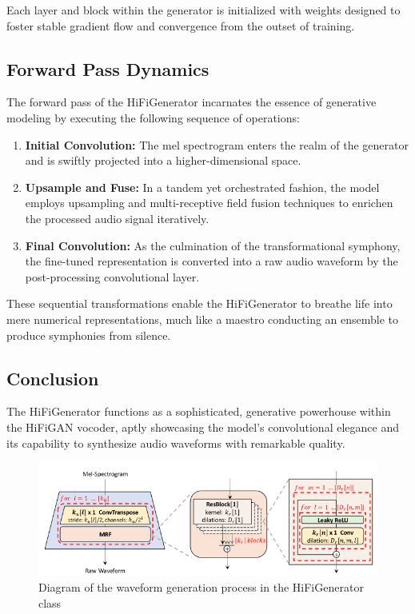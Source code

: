 \documentclass[a4paper]{article}
\begin{document}
Each layer and block within the generator is initialized with weights designed to foster stable gradient flow and convergence from the outset of training.

\subsection{Forward Pass Dynamics}

The forward pass of the HiFiGenerator incarnates the essence of generative modeling by executing the following sequence of operations:

\begin{enumerate}
  \item \textbf{Initial Convolution:} The mel spectrogram enters the realm of the generator and is swiftly projected into a higher-dimensional space.
  
  \item \textbf{Upsample and Fuse:} In a tandem yet orchestrated fashion, the model employs upsampling and multi-receptive field fusion techniques to enrichen the processed audio signal iteratively.
  
  \item \textbf{Final Convolution:} As the culmination of the transformational symphony, the fine-tuned representation is converted into a raw audio waveform by the post-processing convolutional layer.
\end{enumerate}

These sequential transformations enable the HiFiGenerator to breathe life into mere numerical representations, much like a maestro conducting an ensemble to produce symphonies from silence.

\subsection{Conclusion}

The HiFiGenerator functions as a sophisticated, generative powerhouse within the HiFiGAN vocoder, aptly showcasing the model's convolutional elegance and its capability to synthesize audio waveforms with remarkable quality.

\begin{figure}[ht]
  \centering
  \includegraphics[width=\linewidth]{hifigan-generator.png}
  \caption{Diagram of the waveform generation process in the HiFiGenerator class}
  \label{fig:hifi_generator}
\end{figure}
\end{document}
